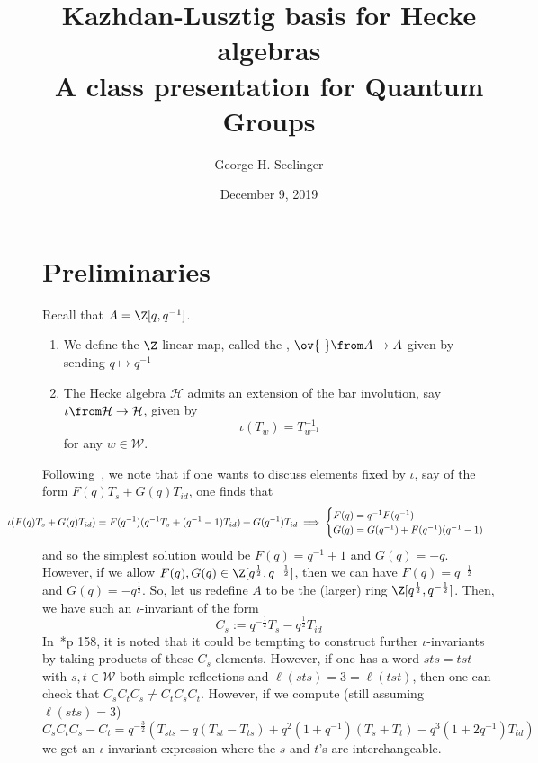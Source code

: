 \documentclass[11pt,leqno,oneside]{amsart}
\title[Kazhdan-Lusztig Basis]{Kazhdan-Lusztig basis for Hecke algebras
  \\ A class presentation for Quantum Groups}
\author{George H. Seelinger}
\date{December 9, 2019}
\numberwithin{thm}{section}
\renewcommand{\W}{\mathcal{W}}
\renewcommand{\H}{\mathcal{H}} %
\begin{document}
\maketitle
\section{Preliminaries}

\begin{defn}
  Recall that \(A = \Z[q,q^{-1}]\).
  \begin{enumerate}
  \item We define the \(\Z\)-linear map, called the , \(\ov{\ } \from A \to A\)
    given by sending \(q \mapsto q^{-1}\)
  \item   The Hecke algebra \(\H\) admits an extension of the bar
    involution, say \(\iota \from \H
  \to \H\), given by \[
    \iota(T_w) = T_{w^{-1}}^{-1}
  \]
  for any \(w \in \W\).
  \end{enumerate}
\end{defn}
Following~\cite{williamson}, we note that if one wants to discuss elements fixed by \(\iota\), say of the form
\(F(q)T_s + G(q)T_{id}\), one finds that \[
   \hspace{-0.5in}\iota(F(q)T_s + G(q)T_{id}) = F(q^{-1})(q^{-1}T_s+(q^{-1}-1)T_{id})
   + G(q^{-1})T_{id} \implies
   \begin{cases}
     F(q) = q^{-1}F(q^{-1}) \\
     G(q) = G(q^{-1})+F(q^{-1})(q^{-1}-1)
   \end{cases}
 \]
 and so the simplest solution would be \(F(q) = q^{-1}+1\) and
 \(G(q)=-q\). However, if we allow \(F(q),G(q) \in \Z[q^{\frac{1}{2}},
 q^{-\frac{1}{2}}]\), then we can have \(F(q) = q^{-\frac{1}{2}}\) and \(G(q) =
 -q^{\frac{1}{2}}\). So, let us redefine \(A\) to be the (larger) ring
 \(\Z[q^{\frac{1}{2}},q^{-\frac{1}{2}}]\). Then, we have such an \(\iota\)-invariant
 of the form \[
   C_s := q^{-\frac{1}{2}} T_s - q^{\frac{1}{2}} T_{id}
 \]
 In~\cite{humphreys}*{p 158}, it is noted that it could be tempting to
 construct further \(\iota\)-invariants by taking products of these
 \(C_s\) elements. However, if one has a word \(sts = tst\) with \(s,t
 \in \W\) both simple reflections and \(\ell(sts) = 3 = \ell(tst)\),
 then one can check that \(C_s C_t C_s \neq C_t C_s C_t\). However, if
 we compute (still assuming \(\ell(sts) = 3\)) \[
   C_s C_t C_s - C_t = q^{-\frac{3}{2}}(T_{sts}-q(T_{st}-T_{ts})+q^2(1+q^{-1})(T_s+T_t)-q^3(1+2q^{-1})T_{id})
 \]
 we get an \(\iota\)-invariant expression where the \(s\) and \(t\)'s
 are interchangeable.
\end{document}
